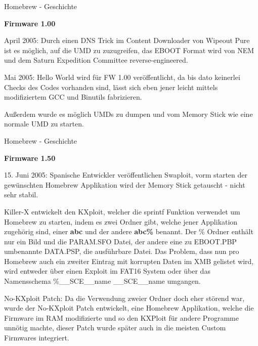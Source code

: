 \documentclass[mode=print,paper=screen,size=10pt,style=paintings]{powerdot}
\newcommand{\Anf}[1]{\glqq #1\grqq}
\begin{document}
\begin{slide}{Homebrew - Geschichte}
	\begin{large}\textbf{Firmware 1.00}\end{large}
	\begin{list}{-}{}
		\item{April 2005: Durch einen DNS Trick im Content Downloader von Wipeout Pure ist es möglich, auf die UMD zu
			zuzugreifen, das EBOOT Format wird von NEM und dem \Anf{Saturn Expedition Committee} reverse-engineered.}
		\item{Mai 2005: Hello World wird für FW 1.00 veröffentlicht, da bis dato keinerlei Checks des Codes vorhanden sind,
			lässt sich eben jener leicht mittels modifiziertem GCC und Binutils fabrizieren.}
		\item{Außerdem wurde es möglich UMDs zu dumpen und vom Memory Stick wie eine normale UMD zu starten.}
	\end{list}
\end{slide}

\begin{slide}{Homebrew - Geschichte}
	\begin{large}\textbf{Firmware 1.50}\end{large}
	\begin{list}{-}{}
		\item{15. Juni 2005: Spanische Entwickler veröffentlichen Swaploit, vorm starten der gewünschten Homebrew Applikation
			wird der Memory Stick getauscht - nicht sehr stabil.}
		\item{Killer-X entwickelt den KXploit, welcher die sprintf Funktion verwendet um Homebrew zu starten, indem es zwei 
			Ordner gibt, welche jener Applikation zugehörig sind, einer \textbf{abc} und der andere \textbf{abc\%} benannt.
			Der \% Ordner enthält nur ein Bild und die PARAM.SFO Datei, der andere eine zu EBOOT.PBP umbenannte DATA.PSP,
			die ausführbare Datei. Das Problem, dass nun pro Homebrew auch ein zweiter Eintrag mit korrupten Daten im XMB
			gelistet wird, wird entweder über einen Exploit im FAT16 System oder über das Namensschema \%\_\_SCE\_\_name
			\_\_SCE\_\_name umgangen.}
		\item{No-KXploit Patch: Da die Verwendung zweier Ordner doch eher störend war, wurde der No-KXploit Patch entwickelt,
			eine Homebrew Applikation, welche die Firmware im RAM modifizierte und so den KXPloit für andere Programme unnötig
			machte, dieser Patch wurde später auch in die meisten Custom Firmwares integriert.}
	\end{list}
\end{slide}
\end{document}
